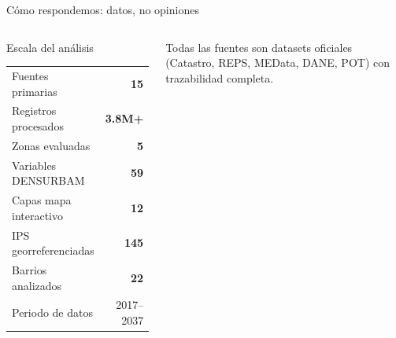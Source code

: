 \documentclass[aspectratio=169, 11pt]{beamer}
\begin{document}
\begin{frame}{Cómo respondemos: datos, no opiniones}
\begin{columns}[T]
\begin{block}{\small Escala del análisis}
\footnotesize
\begin{tabular}{@{}lr@{}}
\toprule
Fuentes primarias & \textbf{15} \\
Registros procesados & \textbf{3.8M+} \\
Zonas evaluadas & \textbf{5} \\
Variables DENSURBAM & \textbf{59} \\
Capas mapa interactivo & \textbf{12} \\
IPS georreferenciadas & \textbf{145} \\
Barrios analizados & \textbf{22} \\
Periodo de datos & 2017--2037 \\
\bottomrule
\end{tabular}
\end{block}

\vspace{4pt}
{\footnotesize Todas las fuentes son datasets oficiales (Catastro, REPS, MEData, DANE, POT) con trazabilidad completa.}
\end{columns}
\end{frame}
\end{document}
